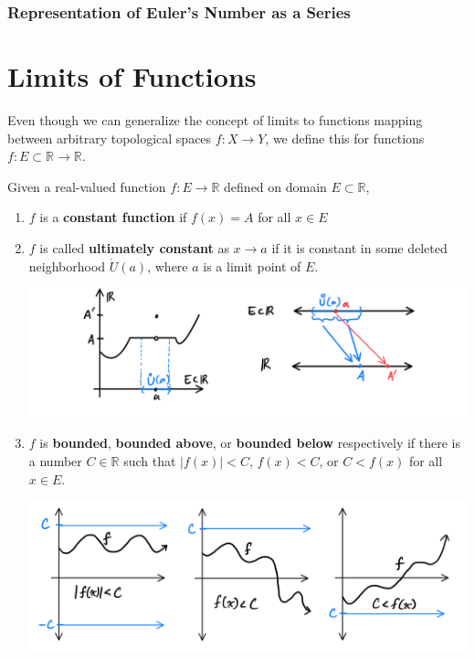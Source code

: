 \documentclass{article}
\begin{document}
    \subsubsection{Representation of Euler's Number as a Series}

\section{Limits of Functions}

    Even though we can generalize the concept of limits to functions mapping between arbitrary topological spaces $f: X \longrightarrow Y$, we define this for functions $f: E \subset \mathbb{R} \longrightarrow \mathbb{R}$. 

    \begin{definition}[Functions]
      Given a real-valued function $f: E \longrightarrow \mathbb{R}$ defined on domain $E \subset \mathbb{R}$,
      \begin{enumerate}
        \item $f$ is a \textbf{constant function} if $f(x) = A$ for all $x \in E$
        \item $f$ is called \textbf{ultimately constant} as $x \rightarrow a$ if it is constant in some deleted neighborhood $\mathring{U} (a)$, where $a$ is a limit point of $E$.
        \begin{center}
            \includegraphics[scale=0.25]{img/Ultimately_Constant_Function.PNG}
        \end{center}
        \item $f$ is \textbf{bounded}, \textbf{bounded above}, or \textbf{bounded below} respectively if there is a number $C \in \mathbb{R}$ such that $|f(x)|<C$, $f(x)<C$, or $C<f(x)$ for all $x \in E$.
        \begin{center}
            \includegraphics[scale=0.25]{img/Bounded_Three.PNG}

\end{center}
\end{enumerate}
\end{definition}
\end{document}
